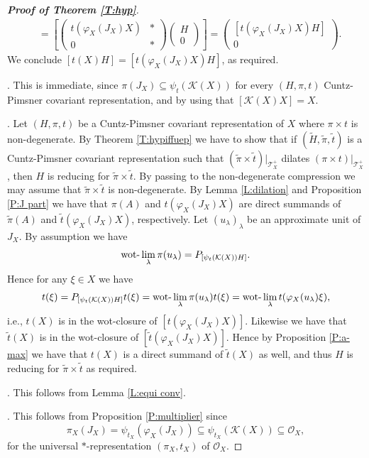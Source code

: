 \documentclass[11pt, draft]{amsart}
\numberwithin{equation}{section}
\theoremstyle{plain}
\theoremstyle{definition}
\theoremstyle{remark}
\newcommand{\K}{{\mathcal{K}}}
\renewcommand{\O}{{\mathcal{O}}}
\newcommand{\T}{{\mathcal{T}}}
\def\la{\lambda}
\newcommand\vphi{\varphi}
\newcommand{\wt}{\widetilde}
\begin{document}
\begin{proof}[{\bf Proof of Theorem \ref{T:hyp}}]
\begin{align*}
& =
\left[\begin{pmatrix} t(\vphi_X(J_X)X) & * \\ 0 & * \end{pmatrix}
\begin{pmatrix} H \\  0 \end{pmatrix} \right]
=
\begin{pmatrix} [t(\vphi_X(J_X)X) H] \\ 0 \end{pmatrix}.
\end{align*}
We conclude $[t(X)H] = [t(\vphi_X(J_X)X)H]$, as required.

\medskip

\noindent
[(v) $\Rightarrow$ (iv)]. 
This is immediate, since $\pi(J_X) \subseteq \psi_t(\K(X))$ for every $(H,\pi,t)$ Cuntz-Pimsner covariant representation, and by using that $[\K(X) X] = X$.

\medskip

. 
Let $(H,\pi,t)$ be a Cuntz-Pimsner covariant representation of $X$ where $\pi\times t$ is non-degenerate.
By Theorem \ref{T:hypiffuep} we have to show that if  $(\wt{H}, \wt{\pi}, \wt{t})$ is a Cuntz-Pimsner covariant representation such that $(\wt{\pi} \times \wt{t})|_{\T_X^+}$ dilates $(\pi \times t)|_{\T_X^+}$, then $H$ is reducing for $\wt{\pi} \times \wt{t}$.
By passing to the non-degenerate compression we may assume that $\wt{\pi} \times \wt{t}$ is non-degenerate.
By Lemma \ref{L:dilation} and Proposition \ref{P:J part} we have that $\pi(A)$ and $t(\vphi_X(J_X)X)$ are direct summands of $\wt{\pi}(A)$ and $\wt{t}(\vphi_X(J_X)X)$, respectively.
Let $(u_\la)_\la$ be an approximate unit of $J_X$.
By assumption we have
\[
\textup{wot-}\lim_\la \pi(u_\la) = P_{[\psi_t(\K(X))H]}.
\]
Hence for any $\xi \in X$ we have
\[
t(\xi) = P_{[\psi_t(\K(X))H]} t(\xi) = \textup{wot-}\lim_\la \pi(u_\la) t(\xi) = \textup{wot-}\lim_\la t(\vphi_X(u_\la) \xi),
\]
i.e., $t(X)$ is in the wot-closure of $[t(\vphi_X(J_X)X)]$.
Likewise we have that $\wt{t}(X)$ is in the wot-closure of $[\wt{t}(\vphi_X(J_X)X)]$.
Hence by Proposition \ref{P:a-max} we have that $t(X)$ is a direct summand of $\wt{t}(X)$ as well, and thus $H$ is reducing for $\wt{\pi} \times \wt{t}$ as required.

\medskip

\noindent
[(v) $\Leftrightarrow$ (vi)]. 
This follows from Lemma \ref{L:equi conv}.

\medskip

. 
This follows from Proposition \ref{P:multiplier} since
\[
\pi_X(J_X) = \psi_{t_X}(\vphi_X(J_X)) \subseteq \psi_{t_X}(\K(X)) \subseteq \O_X,
\]
for the universal $*$-representation $(\pi_X, t_X)$ of $\O_X$.


\end{proof}
\end{document}
